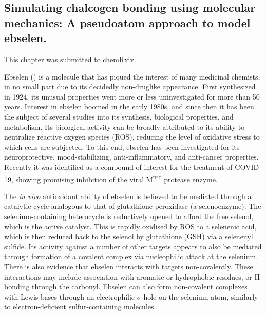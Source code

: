 \begin{refsection}

\chapter[Simulating chalcogen bonding using molecular mechanics]{Simulating chalcogen bonding using molecular mechanics: A pseudoatom approach to model ebselen.}

This chapter was submitted to chemRxiv...

Ebselen () is a molecule that has piqued the interest of many medicinal chemists, in no small part due to its decidedly non-druglike appearance.
First synthesized in 1924, its unusual properties went more or less uninvestigated for more than 50 years.\autocite{Lesser1924}
Interest in ebselen boomed in the early 1980s, and since then it has been the subject of several studies into its synthesis, biological properties, and metabolism.\autocite{Weber1976,Renson1981,Muller1984,Wendel1984,Parnham1984,Engman1989,Schewe1995,Bhabak2010,Iwasaki2017}
Its biological activity can be broadly attributed to its ability to neutralize reactive oxygen species (ROS), reducing the level of oxidative stress to which cells are subjected.\autocite{Mugesh2000}
To this end, ebselen has been investigated for its neuroprotective, mood-stabilizing, anti-inflammatory, and anti-cancer properties.\autocite{Parnham1987,Kil2007,Singh2013,Azad2014,Parnham2000,Chantadul2020}
Recently it was identified as a compound of interest for the treatment of COVID-19, showing promising inhibition of the viral M\textsuperscript{pro} protease enzyme.\autocite{Jin2020}

The \emph{in vivo} antioxidant ability of ebselen is believed to be mediated through a catalytic cycle analogous to that of glutathione peroxidase (a selenoenzyme).\autocite{Antony2011}
The selenium-containing heterocycle is reductively opened to afford the free selenol, which is the active catalyst.
This is rapidly oxidised by ROS to a selenenic acid, which is then reduced back to the selenol by glutathione (GSH) via a selenenyl sulfide.
Its activity against a number of other targets appears to also be mediated through formation of a covalent complex via nucleophilic attack at the selenium.
There is also evidence that ebselen interacts with targets non-covalently.\autocite{Jin2020}
These interactions may include association with aromatic or hydrophobic residues, or H-bonding through the carbonyl.
Ebselen can also form non-covalent complexes with Lewis bases through an electrophilic $\sigma$-hole on the selenium atom, similarly to electron-deficient sulfur-containing molecules.\autocite{Thomas2015,Fellowes2019,Beno2015}


\end{refsection}
